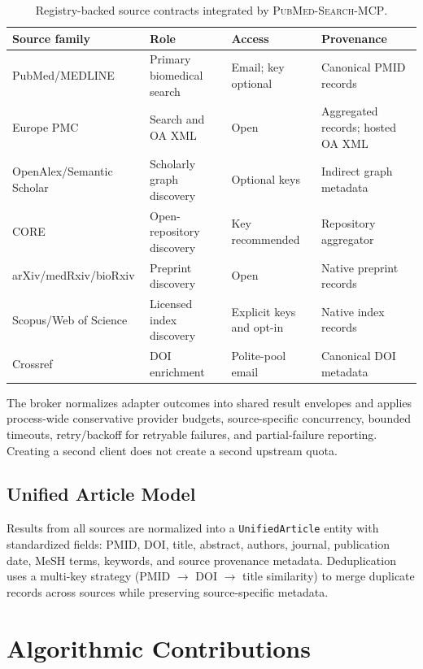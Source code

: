 \documentclass[11pt,a4paper]{article}
\newcommand{\system}{\textsc{PubMed-Search-MCP}}
\begin{document}
\begin{table}[htbp]
\centering
\caption{Registry-backed source contracts integrated by \system{}.}
\label{tab:sources}
\begin{tabular}{llll}
\toprule
\textbf{Source family} & \textbf{Role} & \textbf{Access} & \textbf{Provenance} \\
\midrule
PubMed/MEDLINE & Primary biomedical search & Email; key optional & Canonical PMID records \\
Europe PMC & Search and OA XML & Open & Aggregated records; hosted OA XML \\
OpenAlex/Semantic Scholar & Scholarly graph discovery & Optional keys & Indirect graph metadata \\
CORE & Open-repository discovery & Key recommended & Repository aggregator \\
arXiv/medRxiv/bioRxiv & Preprint discovery & Open & Native preprint records \\
Scopus/Web of Science & Licensed index discovery & Explicit keys and opt-in & Native index records \\
Crossref & DOI enrichment & Polite-pool email & Canonical DOI metadata \\
\bottomrule
\end{tabular}
\end{table}

The broker normalizes adapter outcomes into shared result envelopes and applies process-wide conservative provider budgets, source-specific concurrency, bounded timeouts, retry/backoff for retryable failures, and partial-failure reporting. Creating a second client does not create a second upstream quota.

\subsection{Unified Article Model}

Results from all sources are normalized into a \texttt{UnifiedArticle} entity with standardized fields: PMID, DOI, title, abstract, authors, journal, publication date, MeSH terms, keywords, and source provenance metadata.
Deduplication uses a multi-key strategy (PMID $\rightarrow$ DOI $\rightarrow$ title similarity) to merge duplicate records across sources while preserving source-specific metadata.

\section{Algorithmic Contributions}
\label{sec:algorithms}
\end{document}
